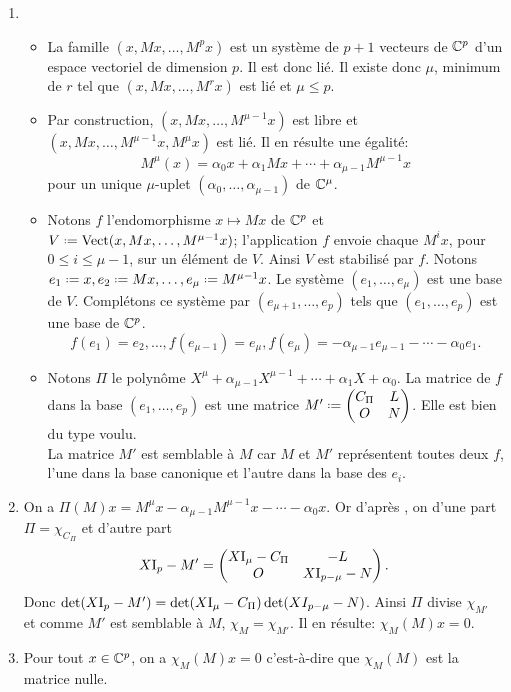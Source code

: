 \begin{solution}
    \begin{enumerate}
        \item 
        \begin{itemize}
            \item La famille $(x, Mx, \dots, M^p x)$ est un système de $p+1$ vecteurs de $\mathbb{C}^p$ d'un espace vectoriel de dimension $p$. Il est donc lié. Il existe donc $\mu$, minimum de $r$ tel que $(x, Mx, \dots, M^r x)$ est lié et $\mu \leqslant p$. 
            \item Par construction, $(x, Mx, \dots, M^{\mu-1} x)$ est libre et $(x, Mx, \dots, M^{\mu-1} x, M^\mu x)$ est lié. Il en résulte une égalité: 
            $$M^\mu(x) = \alpha_0 x + \alpha_1 M x + \cdots + \alpha_{\mu-1} M^{\mu-1} x$$
            pour un unique $\mu$-uplet $(\alpha_0, \dots, \alpha_{\mu-1})$ de $\mathbb{C}^\mu$. \\
            \item Notons $f$ l'endomorphisme $x \mapsto Mx$ de $\mathbb{C}^p$ et $V \defeq \Vect(x, Mx, \dots, M^{\mu-1} x)$; l'application $f$ envoie chaque $M^i x$, pour $0 \leqslant i \leqslant \mu - 1$, sur un élément de $V$. Ainsi $V$ est stabilisé par $f$.
            Notons $e_1 \defeq x, e_2 \defeq M x, \dots, e_\mu \defeq M^{\mu-1} x$. Le système $(e_1, \dots, e_\mu)$ est une base de $V$. Complétons ce système par $(e_{\mu+1}, \dots, e_p)$ tels que $(e_1, \dots, e_p)$ est une base de $\mathbb{C}^p$. 
            $$f(e_1) = e_2, \dots, f(e_{\mu-1}) = e_\mu, f(e_\mu) = -\alpha_{\mu-1} e_{\mu-1} - \cdots - \alpha_0 e_1.$$
            \item Notons $\Pi$ le polynôme $X^\mu + \alpha_{\mu-1} X^{\mu-1} + \cdots + \alpha_1 X + \alpha_0$. La matrice de $f$ dans la base $(e_1, \dots, e_p)$ est une matrice 
            $M' \defeq
            \begin{pmatrix}
                C_\Pi & L \\
                O & N
            \end{pmatrix}
            $. Elle est bien du type voulu. \\
            La matrice $M'$ est semblable à $M$ car $M$ et $M'$ représentent toutes deux $f$, l'une dans la base canonique et l'autre dans la base des $e_i$. 
        \end{itemize}
        \item On a $\Pi(M)x = M^\mu x - \alpha_{\mu-1}M^{\mu-1}x - \cdots - \alpha_0 x$. Or d'après , on d'une part $\Pi = \chi_{C_\Pi}$ et d'autre part 
        $$X \mathrm{I}_p - M' = \begin{pmatrix}
            X \mathrm{I}_\mu - C_\Pi & -L \\
            O & X \mathrm{I}_{p-\mu} - N
        \end{pmatrix}.$$
        Donc $\det(X \mathrm{I}_p - M') = \det(X \mathrm{I}_\mu - C_\Pi) \det(X I_{p-\mu} - N)$. Ainsi $\Pi$ divise $\chi_{M'}$ et comme $M'$ est semblable à $M$, $\chi_M = \chi_{M'}$. Il en résulte: $\chi_M(M)x = 0$.
        \item Pour tout $x \in \mathbb{C}^p$, on a $\chi_M(M)x = 0$ c'est-à-dire que $\chi_M(M)$ est la matrice nulle.
    \end{enumerate}
\end{solution}
